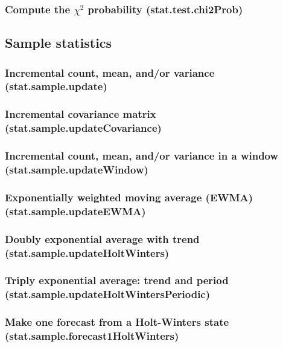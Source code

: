 \documentclass{article}
\theoremstyle{definition}
\begin{document}
\subsubsection{Compute the $\chi^2$ probability (stat.test.chi2Prob)}

\subsection{Sample statistics}

\subsubsection{Incremental count, mean, and/or variance (stat.sample.update)}

\subsubsection{Incremental covariance matrix (stat.sample.updateCovariance)}

\subsubsection{Incremental count, mean, and/or variance in a window (stat.sample.updateWindow)}

\subsubsection{Exponentially weighted moving average (EWMA) (stat.sample.updateEWMA)}

\subsubsection{Doubly exponential average with trend (stat.sample.updateHoltWinters)}

\subsubsection{Triply exponential average: trend and period (stat.sample.updateHoltWintersPeriodic)}

\subsubsection{Make one forecast from a Holt-Winters state (stat.sample.forecast1HoltWinters)}
\end{document}

